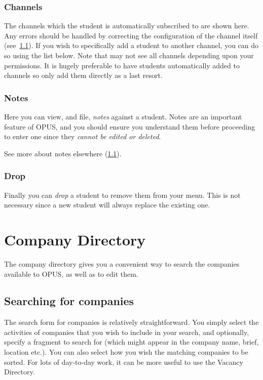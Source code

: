 \documentclass[12 pt]{book}
\begin{document}
\subsection{Channels}

The channels which the student is automatically subscribed to are shown here.
Any errors should be handled by correcting the configuration of the channel
itself (see~\ref{}). If you wish to specifically add a student to another
channel, you can do so using the list below. Note that may not see all channels
depending upon your permissions. It is hugely preferable to have students
automatically added to channels so only add them directly as a last resort.

\subsection{Notes}

Here you can view, and file, \emph{notes} against a student. Notes are an
important feature of OPUS, and you should ensure you understand them before
proceeding to enter one since they \emph{cannot be edited or deleted}.

See more about notes elsewhere (\ref{}).

\subsection{Drop}

Finally you can \emph{drop} a student to remove them from your menu. This is
not necessary since a new student will always replace the existing one.

%
%
%

\chapter{Company Directory}

The company directory gives you a convenient way to search the companies
available to OPUS, as well as to edit them.

\section{Searching for companies}

The search form for companies is relatively straightforward. You simply select
the activities of companies that you wish to include in your search, and
optionally, specify a fragment to search for (which might appear in the
company name, brief, location etc.). You can also select how you wish the
matching companies to be sorted. For lots of day-to-day work, it can be
more useful to use the Vacancy Directory.
\end{document}
